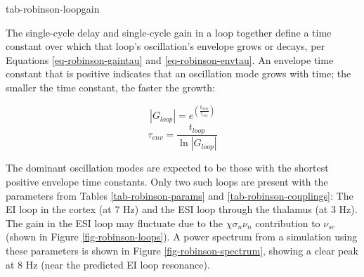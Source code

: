 {tab-robinson-loopgain}

The single-cycle delay and single-cycle gain in a loop together define a time
constant over which that loop's oscillation's envelope grows or decays,
per Equations \ref{eq-robinson-gaintau} and \ref{eq-robinson-envtau}.
An envelope time constant that is positive indicates that an oscillation
mode grows with time; the smaller the time constant, the faster the growth:

\begin{equation}
| G_{loop} | = e^{\left ( \frac{t_{loop}}{\tau_{env}} \right )}
\label{eq-robinson-gaintau}
\end{equation}
%
\begin{equation}
\tau_{env} = \frac{t_{loop}}{\ln | G_{loop} |}
\label{eq-robinson-envtau}
\end{equation}

The dominant oscillation modes are expected to be those with the shortest
positive envelope time constants. Only two such loops are present with the
parameters from Tables \ref{tab-robinson-params} and
\ref{tab-robinson-couplings}: The EI loop in the cortex (at 7 Hz) and the
ESI loop through the thalamus (at 3 Hz). The gain in the ESI loop may
fluctuate due to the $\chi \sigma_n \nu_n$ contribution to $\nu_{se}$ (shown
in Figure \ref{fig-robinson-loops}). A power spectrum from a simulation
using these parameters is shown in Figure \ref{fig-robinson-spectrum},
showing a clear peak at 8 Hz (near the predicted EI loop resonance).

